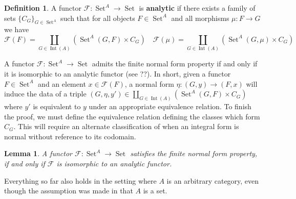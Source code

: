 \documentclass[12pt]{article}
\theoremstyle{plain}
\newtheorem{lemma}[thm]{Lemma}
\theoremstyle{definition}
\newtheorem{defn}[thm]{Definition} %
\newcommand{\scr}[1]{\mathscr{#1}}
\newcommand{\lto}{\longrightarrow}
\DeclareMathOperator{\set}{Set}
\begin{document}
\begin{defn}\label{def:analytic}
		A functor $\scr{F}: \set^A \lto \set$ is \textbf{analytic} if there exists a family of sets $\lbrace C_{G}\rbrace_{G \in \set^A}$ such that for all objects $F \in \set^A$ and all morphisms $\mu: F \lto G$ we have
		\begin{equation*}
			\scr{F}(F) = \coprod_{G \in \operatorname{Int}(A)}(\set^A(G,F) \times C_G)\quad \scr{F}(\mu) = \coprod_{G \in \operatorname{Int}(A)}(\set^A(G,\mu) \times C_G)
			\end{equation*}
		\end{defn}

A functor $\scr{F}: \set^A \lto \set$ admits the finite normal form property if and only if it is isomorphic to an analytic functor (see ??). In short, given a functor $F \in \set^A$ and an element $x \in \scr{F}(F)$, a normal form $\eta: (G, y) \lto (F, x)$ will induce the data of a triple $(G, \eta, y') \in \coprod_{G \in \operatorname{Int}(A)}(\set^A(G,F) \times C_G)$ where $y'$ is equivalent to $y$ under an appropriate equivalence relation. To finish the proof, we must define the equivalence relation defining the classes which form $C_G$. This will require an alternate classification of when an integral form is normal without reference to its codomain.

	\begin{lemma}\label{lem:normal_form_prop--->analytic}
		A functor $\scr{F}: \set^A \lto \set$ satisfies the finite normal form property, if and only if $\scr{F}$ is isomorphic to an analytic functor.
		\end{lemma}

Everything so far also holds in the setting where $A$ is an arbitrary category, even though the assumption was made in \cite{Girard} that $A$ is a set.
	
\end{document}
